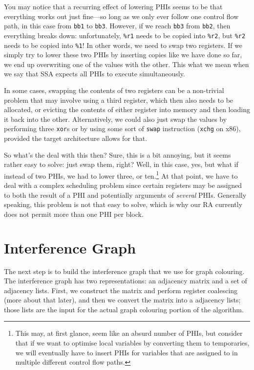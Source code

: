 \documentclass[12pt]{report}
\begin{document}
\noindent You may notice that a recurring effect of lowering PHIs seems to be that everything works out just fine—so long as we only ever
follow one control flow path, in this case from \verb|bb1| to \verb|bb3|. However, if we reach \verb|bb3| from \verb|bb2|, then everything
breaks down: unfortunately, \verb|%r1| needs to be copied into \verb|%r2|, but \verb|%r2| needs to be copied into \verb|%1|! In
other words, we need to swap two registers. If we simply try to lower these two PHIs by inserting copies like we have done so far, we end
up overwriting one of the values with the other. This what we mean when we say that SSA expects all PHIs to execute simultaneously.

In some cases, swapping the contents of two registers can be a non-trivial problem that may involve using a third register, which then also
needs to be allocated, or evicting the contents of either register into memory and then loading it back into the other. Alternatively, we
could also just swap the values by performing three \verb|xor|s or by using some sort of \verb|swap| instruction (\verb|xchg| on
x86), provided the target architecture allows for that.

So what's the deal with this then? Sure, this is a bit annoying, but it seems rather easy to solve: just swap them, right? Well, in this
case, yes, but what if instead of two PHIs, we had to lower three, or ten.\footnote{This may, at first glance, seem like an absurd number of
PHIs, but consider that if we want to optimise local variables by converting them to temporaries, we will eventually have to insert PHIs for
variables that are assigned to in multiple different control flow paths.} At that point, we have to deal with a complex scheduling
problem since certain registers may be assigned to both the result of a PHI and potentially arguments of \textit{several} PHIs. Generally
speaking, this problem is not that easy to solve, which is why our RA currently does not permit more than one PHI per block.

\section{Interference Graph}
The next step is to build the interference graph that we use for graph colouring. The interference graph has two representations: an
adjacency matrix and a set of adjacency lists. First, we construct the matrix and perform register coalescing (more about that later),
and then we convert the matrix into a adjacency lists; those lists are the input for the actual graph colouring portion of the algorithm.
\end{document}

